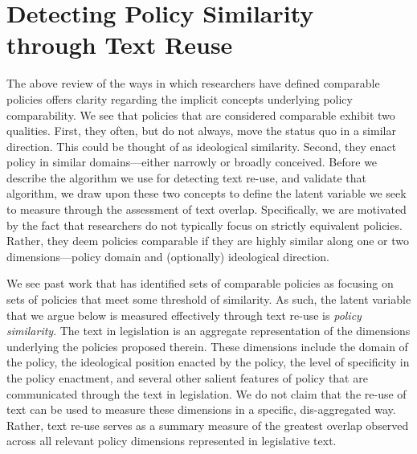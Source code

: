 \documentclass[12pt]{article} %
\begin{document}
\section{Detecting Policy Similarity through Text Reuse}

The above review of the ways in which researchers have defined comparable policies offers clarity regarding the implicit concepts underlying policy comparability. We see that policies that are considered comparable exhibit two qualities. First, they often, but do not always, move the status quo in a similar direction. This could be thought of as ideological similarity. Second, they enact policy in similar domains---either narrowly or broadly conceived. Before we describe the algorithm we use for detecting text re-use, and validate that algorithm, we draw upon these two concepts to define the latent variable we seek to measure through the assessment of text overlap. Specifically, we are motivated by the fact that researchers do not typically focus on strictly equivalent policies. Rather, they deem policies comparable if they are highly similar along one or two dimensions---policy domain and (optionally) ideological direction. 

We see past work that has identified sets of comparable policies as focusing on sets of policies that meet some threshold of similarity. As such, the latent variable that we argue below is measured effectively through text re-use is {\em policy similarity}. The text in legislation is an aggregate representation of the dimensions underlying the policies proposed therein. These dimensions include the domain of the policy, the ideological position enacted by the policy, the level of specificity in the policy enactment, and several other salient features of policy that are communicated through the text in legislation. We do not claim that the re-use of text can be used to measure these dimensions in a specific, dis-aggregated way. Rather, text re-use serves as a summary measure of the greatest overlap observed across all relevant policy dimensions represented in legislative text. 
\end{document}

